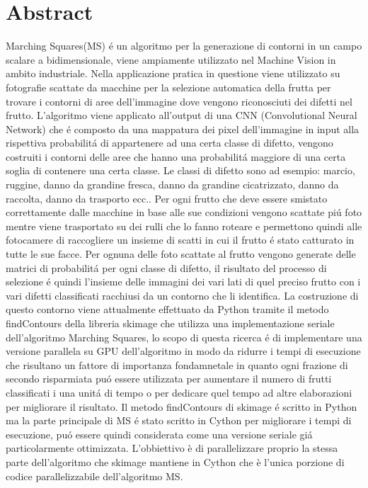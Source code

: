 \documentclass[12pt,a4paper]{report}
\begin{document}
\chapter{Abstract}
Marching Squares(MS) é un algoritmo per la generazione di contorni in un campo scalare a bidimensionale, viene ampiamente utilizzato nel Machine Vision in ambito industriale. Nella applicazione pratica in questione viene utilizzato su fotografie scattate da macchine per la selezione automatica della frutta per trovare i contorni di aree dell'immagine dove vengono riconosciuti dei difetti nel frutto. L'algoritmo viene applicato all'output di una CNN (Convolutional Neural Network) che é composto da una mappatura dei pixel dell'immagine in input alla rispettiva probabilitá di appartenere ad una certa classe di difetto, vengono costruiti i contorni delle aree che hanno una probabilitá maggiore di una certa soglia di contenere una certa classe. Le classi di difetto sono ad esempio: marcio, ruggine, danno da grandine fresca, danno da grandine cicatrizzato, danno da raccolta, danno da trasporto ecc.. \newline
Per ogni frutto che deve essere smistato correttamente dalle macchine in base alle sue condizioni vengono scattate piú foto mentre viene trasportato su dei rulli che lo fanno roteare e permettono quindi alle fotocamere di raccogliere un insieme di scatti in cui il frutto é stato catturato in tutte le sue facce. Per ognuna delle foto scattate al frutto vengono generate delle matrici di probabilitá per ogni classe di difetto, il risultato del processo di selezione é quindi l'insieme delle immagini dei vari lati di quel preciso frutto con i vari difetti classificati racchiusi da un contorno che li identifica. \newline La costruzione di questo contorno viene attualmente effettuato da Python tramite il metodo findContours della libreria skimage che utilizza una implementazione seriale dell'algoritmo Marching Squares, lo scopo di questa ricerca é di implementare una versione parallela su GPU dell'algoritmo in modo da ridurre i tempi di esecuzione che risultano un fattore di importanza fondamnetale in quanto ogni frazione di secondo risparmiata puó essere utilizzata per aumentare il numero di frutti classificati i una unitá di tempo o per dedicare quel tempo ad altre elaborazioni per migliorare il risultato. 
Il metodo findContours di skimage é scritto in Python ma la parte principale di MS é stato scritto in Cython per migliorare i tempi di esecuzione, puó essere quindi considerata come una versione seriale giá particolarmente ottimizzata. L'obbiettivo è di parallelizzare proprio la stessa parte dell'algoritmo che skimage mantiene in Cython che è l'unica porzione di codice parallelizzabile dell'algoritmo MS. \newline
\end{document}
